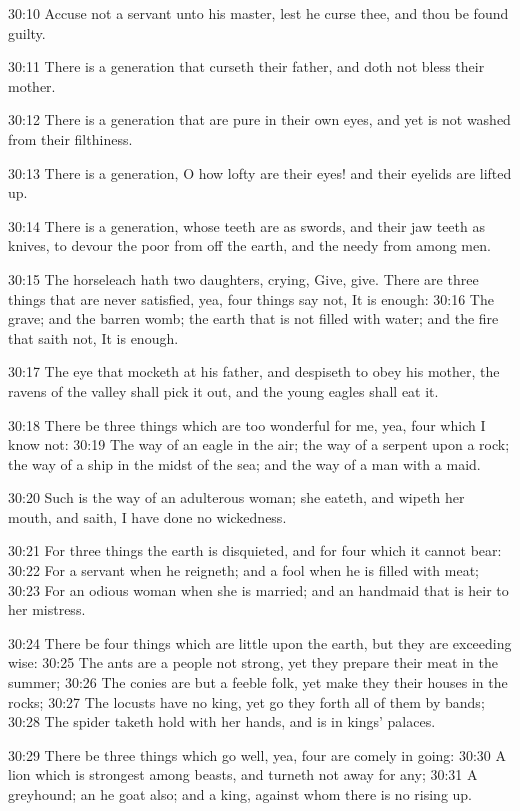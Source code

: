 30:10 Accuse not a servant unto his master, lest he curse thee, and
thou be found guilty.

30:11 There is a generation that curseth their father, and doth not
bless their mother.

30:12 There is a generation that are pure in their own eyes, and yet
is not washed from their filthiness.

30:13 There is a generation, O how lofty are their eyes! and their
eyelids are lifted up.

30:14 There is a generation, whose teeth are as swords, and their jaw
teeth as knives, to devour the poor from off the earth, and the needy
from among men.

30:15 The horseleach hath two daughters, crying, Give, give. There are
three things that are never satisfied, yea, four things say not, It is
enough: 30:16 The grave; and the barren womb; the earth that is not
filled with water; and the fire that saith not, It is enough.

30:17 The eye that mocketh at his father, and despiseth to obey his
mother, the ravens of the valley shall pick it out, and the young
eagles shall eat it.

30:18 There be three things which are too wonderful for me, yea, four
which I know not: 30:19 The way of an eagle in the air; the way of a
serpent upon a rock; the way of a ship in the midst of the sea; and
the way of a man with a maid.

30:20 Such is the way of an adulterous woman; she eateth, and wipeth
her mouth, and saith, I have done no wickedness.

30:21 For three things the earth is disquieted, and for four which it
cannot bear: 30:22 For a servant when he reigneth; and a fool when he
is filled with meat; 30:23 For an odious woman when she is married;
and an handmaid that is heir to her mistress.

30:24 There be four things which are little upon the earth, but they
are exceeding wise: 30:25 The ants are a people not strong, yet they
prepare their meat in the summer; 30:26 The conies are but a feeble
folk, yet make they their houses in the rocks; 30:27 The locusts have
no king, yet go they forth all of them by bands; 30:28 The spider
taketh hold with her hands, and is in kings' palaces.

30:29 There be three things which go well, yea, four are comely in
going: 30:30 A lion which is strongest among beasts, and turneth not
away for any; 30:31 A greyhound; an he goat also; and a king, against
whom there is no rising up.

